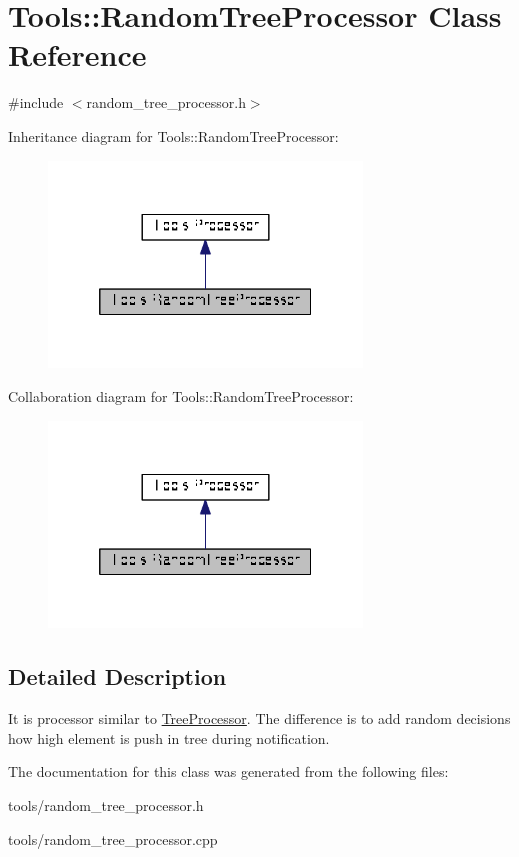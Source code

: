 \hypertarget{classTools_1_1RandomTreeProcessor}{\section{Tools\-:\-:Random\-Tree\-Processor Class Reference}
\label{classTools_1_1RandomTreeProcessor}
}


{\ttfamily \#include $<$random\-\_\-tree\-\_\-processor.\-h$>$}



Inheritance diagram for Tools\-:\-:Random\-Tree\-Processor\-:\nopagebreak
\begin{figure}[H]
\begin{center}
\leavevmode
\includegraphics[width=236pt]{classTools_1_1RandomTreeProcessor__inherit__graph}
\end{center}
\end{figure}


Collaboration diagram for Tools\-:\-:Random\-Tree\-Processor\-:\nopagebreak
\begin{figure}[H]
\begin{center}
\leavevmode
\includegraphics[width=236pt]{classTools_1_1RandomTreeProcessor__coll__graph}
\end{center}
\end{figure}


\subsection{Detailed Description}
It is processor similar to \hyperlink{classTools_1_1TreeProcessor}{Tree\-Processor}. The difference is to add random decisions how high element is push in tree during notification. 

The documentation for this class was generated from the following files\-:\begin{DoxyCompactItemize}
\item 
tools/random\-\_\-tree\-\_\-processor.\-h\item 
tools/random\-\_\-tree\-\_\-processor.\-cpp\end{DoxyCompactItemize}

